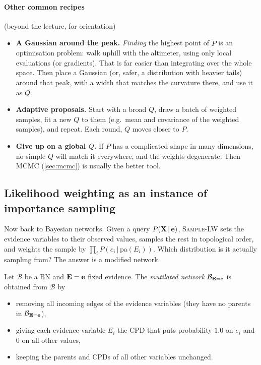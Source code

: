 \documentclass[11pt, oneside]{book}
\newcommand{\Prob}{\mathbb{P}}           %
\newcommand{\given}{\,\vert\,}           %
\newcommand{\pa}{\mathrm{pa}}            %
\newcommand{\bX}{\mathbf{X}}  \newcommand{\bY}{\mathbf{Y}}
\let\originalsubsection\subsection
\renewcommand{\subsection}{\Needspace{6\baselineskip}\originalsubsection}
\begin{document}
\paragraph{Other common recipes} (beyond the lecture, for orientation)
\begin{itemize}
  \item \textbf{A Gaussian around the peak.} \emph{Finding} the highest point of
    $\tilde P$ is an optimisation problem: walk uphill with the altimeter,
    using only local evaluations (or gradients). That is far easier than
    integrating over the whole space. Then place a Gaussian (or, safer, a
    distribution with heavier tails) around that peak, with a width that
    matches the curvature there, and use it as $Q$.
  \item \textbf{Adaptive proposals.} Start with a broad $Q$, draw a batch of
    weighted samples, fit a new $Q$ to them (e.g.\ mean and covariance of the
    weighted samples), and repeat. Each round, $Q$ moves closer to $P$.
  \item \textbf{Give up on a global $Q$.} If $P$ has a complicated shape in many
    dimensions, no simple $Q$ will match it everywhere, and the weights
    degenerate. Then MCMC (\cref{sec:mcmc}) is usually the better tool.
\end{itemize}

\subsection{Likelihood weighting as an instance of importance sampling}

Now back to Bayesian networks. Given a query $P(\bX \given \be)$,
\textsc{Sample-LW} sets the evidence variables to their observed values,
samples the rest in topological order, and weights the sample by
$\prod_i P(e_i \given \pa(E_i))$. Which distribution is it actually sampling
from? The answer is a modified network.

\begin{defbox}[title={Mutilated network}]
Let $\mathcal{B}$ be a BN and $\mathbf{E} = \mathbf{e}$ fixed evidence. The \emph{mutilated
network} $\mathcal{B}_{\mathbf{E} = \mathbf{e}}$ is obtained from $\mathcal{B}$ by
\begin{itemize}
  \item removing all incoming edges of the evidence variables (they have no
    parents in $\mathcal{B}_{\mathbf{E} = \mathbf{e}}$),
  \item giving each evidence variable $E_i$ the CPD that puts probability
    $1.0$ on $e_i$ and $0$ on all other values,
  \item keeping the parents and CPDs of all other variables unchanged.
\end{itemize}
\end{defbox}
\end{document}
